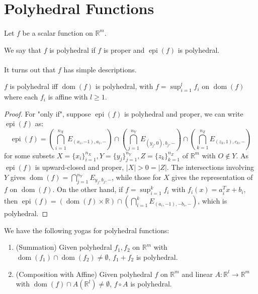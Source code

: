 \section{Polyhedral Functions}

\paragraph{}Let $f$ be a scalar function on $\mathbb{R}^m$.

\begin{defn}\label{defn:026-polyhedral-functions}
	We say that $f$ is polyhedral if $f$ is proper and $\operatorname{epi}(f)$ is polyhedral.
\end{defn}

\paragraph{}It turns out that $f$ has simple descriptions.

\begin{prop}\label{prop:026-polyhedral-function-representation}
	$f$ is polyhedral iff $\operatorname{dom}(f)$ is polyhedral, with $f=\sup_{i=1}^l f_i$ on $\operatorname{dom}(f)$ where each $f_i$ is affine with $l\geq 1$.
\end{prop}
\begin{proof}
	For "only if", suppose $\operatorname{epi}(f)$ is polyhedral and proper, we can write $\operatorname{epi}(f)$ as:
	\[
		\operatorname{epi}(f)=\left(\bigcap_{i=1}^{n_X}E_{(x_i,-1),a_i,-} \right)\cap\left(\bigcap_{j=1}^{n_Y}E_{(y_j,0),b_j,-} \right)\cap\left(\bigcap_{k=1}^{n_Z}E_{(z_k,1),c_k,-} \right)
	\]
	for some subsets $X=\{x_i\}_{i=1}^{n_X},Y=\{y_j\}_{j=1}^{n_Y},Z=\{z_k\}_{k=1}^{n_Z}$ of $\mathbb{R}^m$ with $O\notin Y$. As $\operatorname{epi}(f)$ is upward-closed and proper, $|X|>0=|Z|$. The intersections involving $Y$ gives $\operatorname{dom}(f)=\bigcap_{j=1}^{n_Y}E_{y_j,b_j,-}$, while those for $X$ gives the representation of $f$ on $\operatorname{dom}(f)$. On the other hand, if $f=\sup_{i=1}^kf_i$ with $f_i(x)=a_i^Tx+b_i$, then $\operatorname{epi}(f)=\left(\operatorname{dom}(f)\times \mathbb{R}\right)\cap\left(\bigcap_{i=1}^kE_{(a_i,-1),-b_i,-}\right)$, which is polyhedral.
\end{proof}

\begin{prop}\label{prop:026-yoga-polyhedral}
	We have the following yogas for polyhedral functions:
	\begin{enumerate}[label=(\alph*)]
		\item (Summation) Given polyhedral $f_1,f_2$ on $\mathbb{R}^m$ with $\operatorname{dom}(f_1)\cap\operatorname{dom}(f_2)\neq\emptyset$, $f_1+f_2$ is polyhedral.
		\item (Composition with Affine) Given polyhedral $f$ on $\mathbb{R}^m$ and linear $A:\mathbb{R}^l\to \mathbb{R}^m$ with $\operatorname{dom}(f)\cap A(\mathbb{R}^l)\neq\emptyset$, $f\circ A$ is polyhedral.
	\end{enumerate}
\end{prop}

